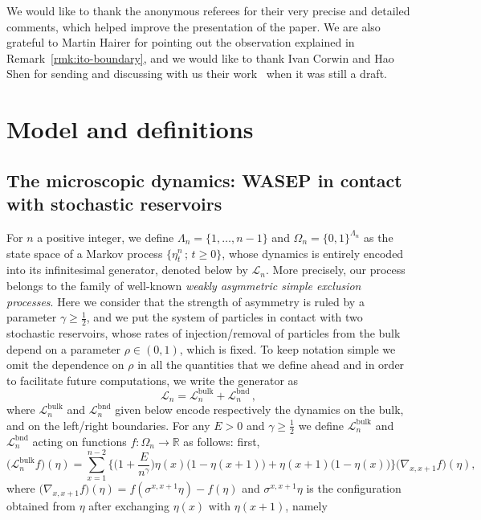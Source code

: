 \documentclass[AHL,Unicode,longabstracts]{cedram}
\DeclareMathOperator{\bulk}{bulk}
\newcommand{\bb}[1]{{\mathbb #1}}
\newcommand{\mc}[1]{{\mathcal #1}}
\renewcommand{\mc}[1]{{\mathcal #1}}
\renewcommand{\geq}{\geqslant}
\begin{document}
We would like to thank the anonymous referees for their very precise and detailed comments, which helped improve the presentation of the paper. We are also grateful to Martin Hairer for pointing out the observation explained in Remark~\ref{rmk:ito-boundary}, and we would like to thank Ivan Corwin and Hao Shen for sending and discussing with us their work~\cite{Corwin2016} when it was still a draft.


\section{Model and definitions}\label{s2}

\subsection{The microscopic dynamics: WASEP in contact with stochastic reservoirs} For $n$ a positive integer, we define $\Lambda_n = \{1,\ldots, n-1\}$ and $\Omega_n=\{0,1\}^{\Lambda_n}$ as the state space of a Markov process $\{\eta_t^n\,; \, t \geq 0\}$, whose dynamics is entirely encoded into its infinitesimal generator, denoted below by $\mc L_n$. More precisely, our process belongs to the family of well-known \emph{weakly asymmetric simple exclusion processes}. Here we consider that the strength of asymmetry is ruled by a parameter $\gamma \geq \frac12$, and we put the system of particles in contact with two stochastic reservoirs, whose rates of injection/removal of particles from the bulk depend on a parameter $\rho\in{(0,1)}$, which is fixed. To keep notation simple we omit the dependence on $\rho$ in all the quantities that we define ahead and in order to facilitate future computations, we write the generator as
\begin{equation*}
\mathcal L_n = \mc L_n^{\bulk} + \mc L_n^{\mathrm{bnd}}\,,
\end{equation*}
where $\mc L_n^{\bulk}$ and $\mc L_n^{\mathrm{bnd}}$ given below encode respectively the dynamics on the bulk, and on the left/right boundaries. For any $E>0$ and $\gamma\geq \frac12$ we define $\mc L_n^{\bulk}$ and $\mc L_n^{\mathrm{bnd}}$ acting on functions $f: \Omega_n \to \bb R$ as follows: first,
\begin{equation*}
\big(\mc L_n^{\bulk} f\big)(\eta) =
\sum_{x=1}^{n-2} \bigg\{\bigg(1+\frac{E}{n^\gamma} \bigg) \eta(x)\big(1-\eta(x+1)\big)+\eta(x+1)\big(1-\eta(x)\big)\bigg\} \big(\nabla_{x,x+1}f\big)(\eta),
\end{equation*}
where $\big(\nabla_{x,x+1}f\big)(\eta)=f(\sigma^{x,x+1}\eta) -f(\eta)$ and $\sigma^{x,x+1} \eta$ is the configuration obtained from $\eta$ after exchanging $\eta(x)$ with $\eta(x+1)$, namely
\end{document}
